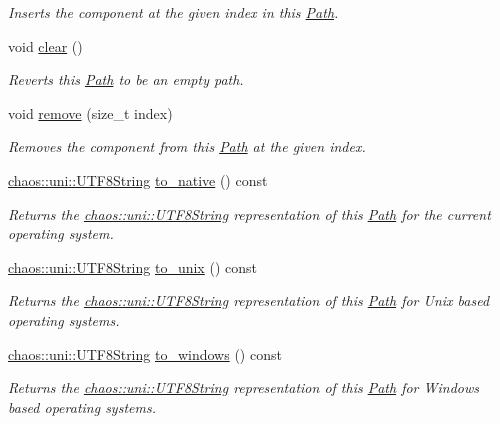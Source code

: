 \begin{DoxyCompactItemize}
\begin{DoxyCompactList}\small\item\em Inserts the component at the given index in this \hyperlink{classchaos_1_1io_1_1sys_1_1_path}{Path}. \end{DoxyCompactList}\item 
void \hyperlink{classchaos_1_1io_1_1sys_1_1_path_a7c4cd7e5d8e21a8c522f8a87f1e90f4c}{clear} ()
\begin{DoxyCompactList}\small\item\em Reverts this \hyperlink{classchaos_1_1io_1_1sys_1_1_path}{Path} to be an empty path. \end{DoxyCompactList}\item 
void \hyperlink{classchaos_1_1io_1_1sys_1_1_path_aefc69b11820209acca278104fb230832}{remove} (size\-\_\-t index)
\begin{DoxyCompactList}\small\item\em Removes the component from this \hyperlink{classchaos_1_1io_1_1sys_1_1_path}{Path} at the given index. \end{DoxyCompactList}\item 
\hyperlink{classchaos_1_1uni_1_1_u_t_f8_string}{chaos\-::uni\-::\-U\-T\-F8\-String} \hyperlink{classchaos_1_1io_1_1sys_1_1_path_adb68b7589d18dc78f19d9dd6936d9833}{to\-\_\-native} () const 
\begin{DoxyCompactList}\small\item\em Returns the \hyperlink{classchaos_1_1uni_1_1_u_t_f8_string}{chaos\-::uni\-::\-U\-T\-F8\-String} representation of this \hyperlink{classchaos_1_1io_1_1sys_1_1_path}{Path} for the current operating system. \end{DoxyCompactList}\item 
\hyperlink{classchaos_1_1uni_1_1_u_t_f8_string}{chaos\-::uni\-::\-U\-T\-F8\-String} \hyperlink{classchaos_1_1io_1_1sys_1_1_path_a1cfe95a7a81ba7da856ae79917e6b1bf}{to\-\_\-unix} () const 
\begin{DoxyCompactList}\small\item\em Returns the \hyperlink{classchaos_1_1uni_1_1_u_t_f8_string}{chaos\-::uni\-::\-U\-T\-F8\-String} representation of this \hyperlink{classchaos_1_1io_1_1sys_1_1_path}{Path} for Unix based operating systems. \end{DoxyCompactList}\item 
\hyperlink{classchaos_1_1uni_1_1_u_t_f8_string}{chaos\-::uni\-::\-U\-T\-F8\-String} \hyperlink{classchaos_1_1io_1_1sys_1_1_path_ad7b185968a88741d52526a32738d0ab4}{to\-\_\-windows} () const 
\begin{DoxyCompactList}\small\item\em Returns the \hyperlink{classchaos_1_1uni_1_1_u_t_f8_string}{chaos\-::uni\-::\-U\-T\-F8\-String} representation of this \hyperlink{classchaos_1_1io_1_1sys_1_1_path}{Path} for Windows based operating systems. \end{DoxyCompactList}\item 

\end{DoxyCompactItemize}
